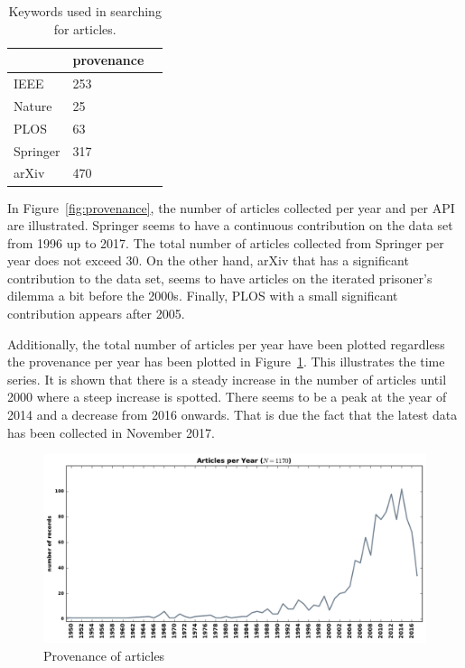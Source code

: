 \documentclass{article}
\begin{document}
\begin{table}[!hbtp]
    \begin{center}
        \begin{tabular}{lll}
            \toprule
             & provenance \\
            \midrule
             IEEE &  253 \\
             Nature & 25 \\  
             PLOS & 63 \\
             Springer & 317 \\
             arXiv & 470 \\
            \bottomrule
        \end{tabular}
    \end{center}
    \caption{Keywords used in searching for articles.}
    \label{table:provenance}
\end{table}


In Figure~\ref{fig:provenance}, the number of articles collected per year
and per API are illustrated. Springer seems to have a continuous contribution on
the data set from 1996 up to 2017. The total number of articles collected from
Springer per year does not exceed 30. On the other hand, arXiv that has a 
significant contribution to the data set, seems to have articles on 
the iterated prisoner's dilemma a bit before the 2000s. Finally, PLOS
with a small significant contribution appears after 2005.

Additionally, the total number of articles per year have been plotted regardless
the provenance per year has been plotted in Figure~\ref{fig:timeline_no_points}.
This illustrates the time series. It is shown that there is a steady increase in
the number of articles until 2000 where a steep increase is spotted. There seems
to be a peak at the year of 2014 and a decrease from 2016 onwards.
That is due the fact that the latest data has been collected in November 2017.

\begin{figure}[!hbtp]
    \centering
    \includegraphics[width=.8\textwidth]{./assets/images/timeline_no_points.pdf}
    \caption{Provenance of articles}
    \label{fig:timeline_no_points}
\end{figure}
\end{document}
